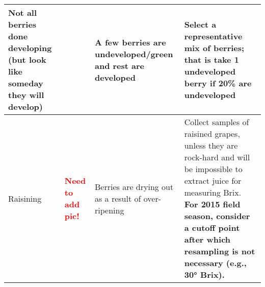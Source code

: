 \documentclass[10pt]{article}
\begin{document}
\begin{table}[H]
\begin{tabular}{ p{3cm}| l | p{4.5cm}| p{4.5cm}}
\hline
Not all berries done developing (but look like someday they will develop)
	& \raisebox{-\totalheight}{\texttt{[image: Underdeveloped.jpg]}} 
	& A few berries are undeveloped/green and rest are developed
	& Select a representative mix of berries; that is take 1 undeveloped berry if 20\% are undeveloped\\
\hline
Raisining
	& \textcolor{red}{\textbf{Need to add pic!}}
	& Berries are drying out as a result of over-ripening
	& Collect samples of raisined grapes, unless they are rock-hard and will be impossible to extract juice for measuring Brix. \textbf{For 2015 field season, consider a cutoff point after which resampling is not necessary (e.g., 30° Brix).} \\
\hline
\end{tabular}
\label{table:nonlin} %
\end{table}
\end{document}
